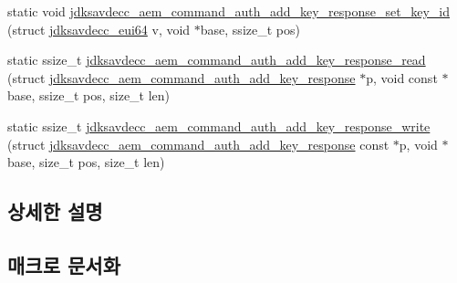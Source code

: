 \begin{DoxyCompactItemize}
static void \hyperlink{group__command__auth__add__key__response_gaa2b18847ccb35b16314bb5e28c91587f}{jdksavdecc\+\_\+aem\+\_\+command\+\_\+auth\+\_\+add\+\_\+key\+\_\+response\+\_\+set\+\_\+key\+\_\+id} (struct \hyperlink{structjdksavdecc__eui64}{jdksavdecc\+\_\+eui64} v, void $\ast$base, ssize\+\_\+t pos)
\item 
static ssize\+\_\+t \hyperlink{group__command__auth__add__key__response_gae17adc87b067e4cb1eabd904f16f5343}{jdksavdecc\+\_\+aem\+\_\+command\+\_\+auth\+\_\+add\+\_\+key\+\_\+response\+\_\+read} (struct \hyperlink{structjdksavdecc__aem__command__auth__add__key__response}{jdksavdecc\+\_\+aem\+\_\+command\+\_\+auth\+\_\+add\+\_\+key\+\_\+response} $\ast$p, void const $\ast$base, ssize\+\_\+t pos, size\+\_\+t len)
\item 
static ssize\+\_\+t \hyperlink{group__command__auth__add__key__response_ga416ab3e062a4fa7d2ab84b472772fedb}{jdksavdecc\+\_\+aem\+\_\+command\+\_\+auth\+\_\+add\+\_\+key\+\_\+response\+\_\+write} (struct \hyperlink{structjdksavdecc__aem__command__auth__add__key__response}{jdksavdecc\+\_\+aem\+\_\+command\+\_\+auth\+\_\+add\+\_\+key\+\_\+response} const $\ast$p, void $\ast$base, size\+\_\+t pos, size\+\_\+t len)
\end{DoxyCompactItemize}


\subsection{상세한 설명}


\subsection{매크로 문서화}
